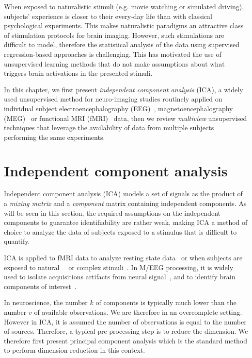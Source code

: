 When exposed to naturalistic stimuli (e.g. movie watching or simulated driving), subjects' experience is closer to their every-day life than with classical
psychological experiments.
% 
This makes naturalistic paradigms an attractive class of
stimulation protocols for brain imaging.
%
However, such stimulations are difficult to model, therefore the statistical analysis of the data using supervised regression-based approaches is challenging.
This has motivated the use of unsupervised learning methods that do not make
assumptions about what triggers brain activations in the presented stimuli.

In this chapter, we first present \emph{independent component analysis} (ICA), a widely used
unsupervised method for neuro-imaging studies routinely applied on individual
subject electroencephalography (EEG)~\cite{makeig1996independent},
magnetoencephalography (MEG)~\cite{vigario1998independent} or functional MRI
(fMRI)~\cite{mckeown1998independent} data, then we review \emph{multiview} unsupervised 
techniques that leverage the availability of data from multiple subjects
performing the same experiments. 

\section{Independent component analysis}
\label{sec:ica}
Independent component analysis (ICA) models a set of signals as the product of a \emph{mixing matrix} and a
\emph{component} matrix containing independent components. As will be seen in this
section, the required assumptions on the independent components to guarantee
identifiability are rather weak, making ICA a method of choice to analyze the
data of subjects exposed to a stimulus that is difficult to quantify.

ICA is applied to fMRI data to analyze resting state
data~\cite{beckmann2005investigations} or when subjects are
exposed to natural~\cite{malinen2007towards}~\cite{bartels2005brain} or complex stimuli~\cite{calhoun2002different}. 
In M/EEG processing, it is widely used to isolate acquisitions artifacts from neural signal~\cite{jung1998extended}, and to identify brain components of interest~\cite{vigario2000independent, delorme2012independent}.

In neuroscience, the number $k$ of components is typically much lower than the number $v$
of available observations. We are therefore in an overcomplete setting.
However in ICA, it is assumed the number of observations is equal to the number
of sources. Therefore, a
typical pre-processing step is to reduce the dimension. We therefore first
present principal component analysis which is the standard method to perform
dimension reduction in this context.

